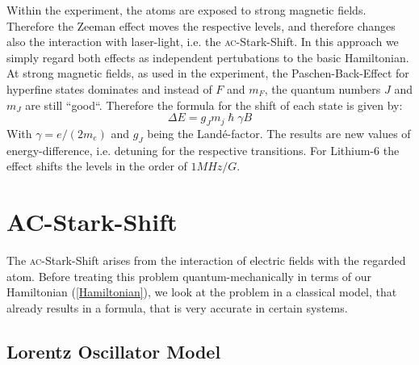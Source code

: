 Within the experiment, the atoms are exposed to strong magnetic fields. Therefore the Zeeman effect moves the respective levels, and therefore changes also the interaction with laser-light, i.e. the \textsc{ac}-Stark-Shift. In this approach we simply regard both effects as independent pertubations to the basic Hamiltonian. At strong magnetic fields, as used in the experiment, the Paschen-Back-Effect for hyperfine states dominates and instead of $F$ and $m_F$, the quantum numbers $J$ and $m_J$ are still “good“. Therefore the formula for the shift of each state is given by:
\begin{equation}
\Delta E=g_Jm_j\hslash\gamma B
\end{equation}
With $\gamma=e/(2m_e)$ and $g_J$ being the Landé-factor. The results are new values of energy-difference, i.e. detuning for the respective transitions. For Lithium-6 the effect shifts the levels in the order of $1\unit{MHz/G}$.

\newpage
\newpage
\section{AC-Stark-Shift}
The \textsc{ac}-Stark-Shift arises from the interaction of electric fields with the regarded atom. Before treating this problem quantum-mechanically in terms of our Hamiltonian (\ref{Hamiltonian}), we look at the problem in a classical model, that already results in a formula, that is very accurate in certain systems. 
\subsection{Lorentz Oscillator Model}

